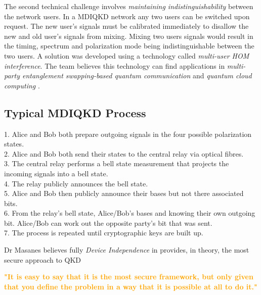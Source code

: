 \documentclass[journal]{vgtc}
\begin{document}
The second technical challenge involves \textit{maintaining indistinguishability} between the network users. In a MDIQKD network any two users can be switched upon request. The new user's signals must be calibrated immediately to disallow the new and old user's signals from mixing. Mixing two users signals would result in the timing, spectrum and polarization mode being indistinguishable between the two users. A solution was developed using a technology called \textit{multi-user HOM interference}. The team believes this technology can find applications in \textit{multi-party entanglement swapping-based quantum communication} and \textit{quantum cloud computing }.


\begin{tcolorbox}
\section*{Typical MDIQKD Process}

1. Alice and Bob both prepare outgoing signals in the four possible polarization states.\\
2. Alice and Bob both send their states to the central relay via optical fibres.\\
3. The central relay performs a bell state measurement that projects the incoming signals into a bell state.\\
4. The relay publicly announces the bell state.\\
5. Alice and Bob then publicly announce their bases but not there associated bits.\\
6. From the relay's bell state, Alice/Bob's bases and knowing their own outgoing bit. Alice/Bob can work out the opposite party's bit that was sent.\\
7. The process is repeated until cryptographic keys are built up.

\end{tcolorbox}


 
\noindent Dr Masanes believes fully \textit{Device Independence} in provides, in theory, the most secure approach to QKD 

\vspace{0.3cm}

\textcolor{orange}{\textbf{"It is easy to say  that it is the most secure framework, but only given that you define the problem in a way that it is possible at all to do it."}}

\vspace{0.3cm}
\end{document}
